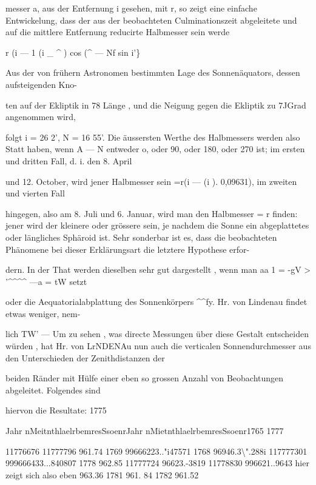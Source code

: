 \documentclass[10pt,a4paper]{article}
\begin{document}
messer a, aus der Entfernung i gesehen, mit r, so zeigt eine einfache Entwickelung, dass der aus der beobachteten Culminationszeit abgeleitete und auf die mittlere Entfernung reducirte Halbmesser sein werde

r (i — 1 (i \_ \textasciicircum{} ) cos (\textasciicircum{} — Nf sin i'\}

Aus der von frühern Astronomen bestimmten Lage des Sonnenäquators, dessen aufsteigenden Kno-

ten auf der Ekliptik in 78\textdegree{} Länge , und die Neigung gegen die Ekliptik zu 7JGrad angenommen wird,

folgt i = 26\textdegree{} 2', N = 16\textdegree{} 55'. Die äussersten Werthe des Halbmessers werden also Statt haben, wenn A — N entweder o, oder 90\textdegree{}, oder 180\textdegree{}, oder 270\textdegree{} ist; im ersten und dritten Fall, d. i. den 8. April

und 12. October, wird jener Halbmesser sein =r(i — (i ). 0,09631), im zweiten und vierten Fall

hingegen, also am 8. Juli und 6. Januar, wird man den Halbmesser = r finden: jener wird der kleinere oder grössere sein, je nachdem die Sonne ein abgeplattetes oder längliches Sphäroid ist. Sehr sonderbar ist es, dass die beobachteten Phänomene bei dieser Erklärungsart die letztere Hypothese erfor-

dern. In der That werden dieselben sehr gut dargestellt , wenn man aa 1 = -gV > '\textasciicircum{}\textasciicircum{}\textasciicircum{}\textasciicircum{} —a = tW setzt

oder die Aequatorialabplattung des Sonnenkörpers \textasciicircum{}\textasciicircum{}fy. Hr. von Lindenau findet etwas weniger, nem-

lich TW' — Um zu sehen , was directe Messungen über diese Gestalt entscheiden würden , hat Hr. von LrNDENAu nun auch die verticalen Sonnendurchmesser aus den Unterschieden der Zenithdistanzen der

beiden Ränder mit Hülfe einer eben so grossen Anzahl von Beobachtungen abgeleitet. Folgendes sind

hiervon die Resultate: 1775

Jahr nMeitnthlaelrbemresSsoenrJahr nMietnthlaelrbemresSsoenr1765 1777

11776676 11777796 961.74 1769 99666223.."i47571 1768 96946.3\textbackslash{}".288i 117777301 999666433...840807 1778 962.85 11777724 96623.-3819 11778830 996621..9643 hier zeigt sich also eben 963.36 1781 961. 84 1782 961.52
\end{document}
